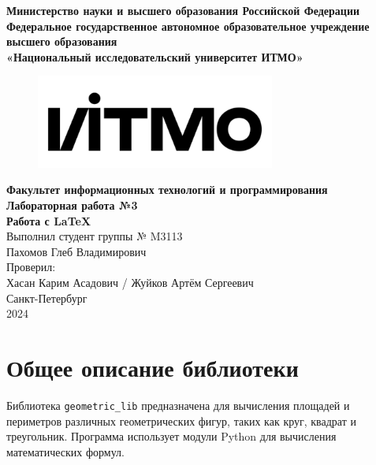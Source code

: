 \documentclass[a4paper,12pt]{article}
\begin{document}
\begin{titlepage}
    \begin{center}
        \textbf{Министерство науки и высшего образования Российской Федерации}\\[0.5cm]
        
        \textbf{Федеральное государственное автономное образовательное учреждение высшего образования}\\
        \textbf{«Национальный исследовательский университет ИТМО»}

        \begin{figure}[h!]
            \centering
            \includegraphics[width=0.7\textwidth]{image.png}
        \end{figure}
        
        \textbf{\large Факультет информационных технологий и программирования}\\[1cm]
        
        \textbf{ Лабораторная работа №3}\\[0.5cm]
        \textbf{ Работа с LaTeX}\\[4cm]
        
        Выполнил студент группы № M3113\\
        Пахомов Глеб Владимирович\\[3cm]
        
        Проверил: \\
        Хасан Карим Асадович / Жуйков Артём Сергеевич\\[2cm]
        
        Санкт-Петербург\\
        2024
    \end{center}
\end{titlepage}

\tableofcontents
\newpage

\section{Общее описание библиотеки}
Библиотека \texttt{geometric\_lib} предназначена для вычисления площадей и периметров различных геометрических фигур, таких как круг, квадрат и треугольник. Программа использует модули Python для вычисления математических формул.
\end{document}
